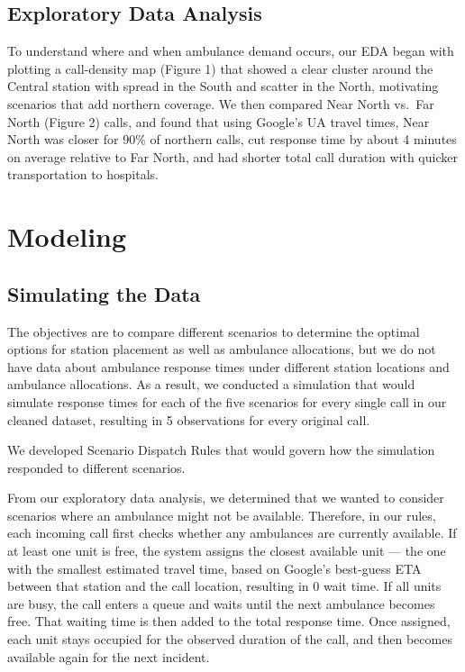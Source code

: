 \documentclass[
]{article}
\begin{document}
\subsection{Exploratory Data Analysis}\label{exploratory-data-analysis}

To understand where and when ambulance demand occurs, our EDA began with
plotting a call-density map (Figure 1) that showed a clear cluster
around the Central station with spread in the South and scatter in the
North, motivating scenarios that add northern coverage. We then compared
Near North vs.~Far North (Figure 2) calls, and found that using Google's
UA travel times, Near North was closer for 90\% of northern calls, cut
response time by about 4 minutes on average relative to Far North, and
had shorter total call duration with quicker transportation to
hospitals.

\section{Modeling}\label{modeling}

\subsection{Simulating the Data}\label{simulating-the-data}

The objectives are to compare different scenarios to determine the
optimal options for station placement as well as ambulance allocations,
but we do not have data about ambulance response times under different
station locations and ambulance allocations. As a result, we conducted a
simulation that would simulate response times for each of the five
scenarios for every single call in our cleaned dataset, resulting in 5
observations for every original call.

We developed Scenario Dispatch Rules that would govern how the
simulation responded to different scenarios.

From our exploratory data analysis, we determined that we wanted to
consider scenarios where an ambulance might not be available. Therefore,
in our rules, each incoming call first checks whether any ambulances are
currently available. If at least one unit is free, the system assigns
the closest available unit --- the one with the smallest estimated
travel time, based on Google's best-guess ETA between that station and
the call location, resulting in 0 wait time. If all units are busy, the
call enters a queue and waits until the next ambulance becomes free.
That waiting time is then added to the total response time. Once
assigned, each unit stays occupied for the observed duration of the
call, and then becomes available again for the next incident.
\end{document}
